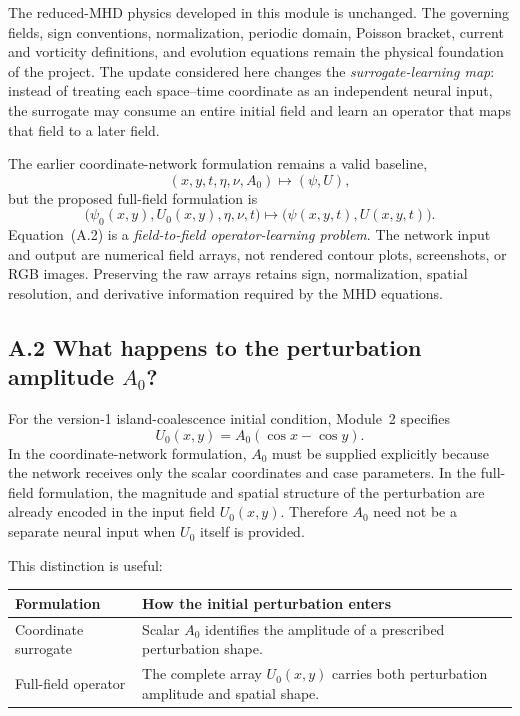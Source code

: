 \documentclass[11pt]{article}
\begin{document}
The reduced-MHD physics developed in this module is unchanged.  The governing
fields, sign conventions, normalization, periodic domain, Poisson bracket,
current and vorticity definitions, and evolution equations remain the physical
foundation of the project.  The update considered here changes the \emph{surrogate-learning
map}: instead of treating each space--time coordinate as an independent neural
input, the surrogate may consume an entire initial field and learn an operator
that maps that field to a later field.

The earlier coordinate-network formulation remains a valid baseline,
\begin{equation}
 (x,y,t,\eta,\nu,A_0)\longmapsto (\psi,U),
 \tag{A.1}
\end{equation}
but the proposed full-field formulation is
\begin{equation}
 \boxed{
 \bigl(\psi_0(x,y),U_0(x,y),\eta,\nu,t\bigr)
 \longmapsto
 \bigl(\psi(x,y,t),U(x,y,t)\bigr).}
 \tag{A.2}
\end{equation}
Equation~(A.2) is a \emph{field-to-field operator-learning problem}.  The
network input and output are numerical field arrays, not rendered contour
plots, screenshots, or RGB images.  Preserving the raw arrays retains sign,
normalization, spatial resolution, and derivative information required by the
MHD equations.

\subsection*{A.2 What happens to the perturbation amplitude $A_0$?}

For the version-1 island-coalescence initial condition, Module~2 specifies
\begin{equation}
 U_0(x,y)=A_0(\cos x-\cos y).
 \tag{A.3}
\end{equation}
In the coordinate-network formulation, $A_0$ must be supplied explicitly
because the network receives only the scalar coordinates and case parameters.
In the full-field formulation, the magnitude and spatial structure of the
perturbation are already encoded in the input field $U_0(x,y)$.  Therefore
$A_0$ need not be a separate neural input when $U_0$ itself is provided.

This distinction is useful:
\begin{center}
\begin{tabular}{p{}p{}}
\toprule
\textbf{Formulation} & \textbf{How the initial perturbation enters}\\
\midrule
Coordinate surrogate & Scalar $A_0$ identifies the amplitude of a prescribed perturbation shape.\\
Full-field operator & The complete array $U_0(x,y)$ carries both perturbation amplitude and spatial shape.\\
\bottomrule
\end{tabular}
\end{center}
\end{document}

